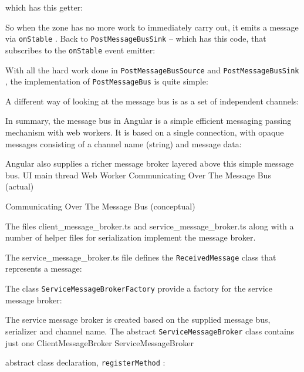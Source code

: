 which has this getter:



So when the zone has no more work to immediately carry out, it emits a message via
\texttt{onStable}
. Back to
\texttt{PostMessageBusSink}
– which has this code, that subscribes to the
\texttt{onStable}
event emitter:



With all the hard work done in
\texttt{PostMessageBusSource}
and
\texttt{PostMessageBusSink}
, the
implementation of
\texttt{PostMessageBus}
is quite simple:



A different way of looking at the message bus is as a set of independent channels:

In summary, the message bus in Angular is a simple efficient messaging passing
mechanism with web workers. It is based on a single connection, with opaque
messages consisting of a channel name (string) and message data:



Angular also supplies a richer message broker layered above this simple message bus.
UI main thread
Web Worker
Communicating Over The Message Bus (actual)

Communicating Over The Message Bus (conceptual)

The files client\_message\_broker.ts and service\_message\_broker.ts along with a
number of helper files for serialization implement the message broker.

The service\_message\_broker.ts file defines the
\texttt{ReceivedMessage}
class that
represents a message:



The class
\texttt{ServiceMessageBrokerFactory}
provide a factory for the service message
broker:



The service message broker is created based on the supplied message bus, serializer
and channel name. The abstract
\texttt{ServiceMessageBroker}
class contains just one
ClientMessageBroker
ServiceMessageBroker

abstract class declaration,
\texttt{registerMethod}
:

